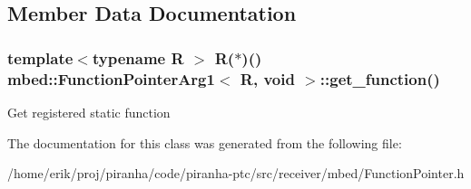 \subsection{Member Data Documentation}
\subsubsection[{\texorpdfstring{get\+\_\+function}{get_function}}]{\setlength{\rightskip}{0pt plus 5cm}template$<$typename R $>$ R($\ast$)() {\bf mbed\+::\+Function\+Pointer\+Arg1}$<$ R, void $>$\+::get\+\_\+function()\hspace{0.3cm}{\ttfamily [inline]}}\hypertarget{classmbed_1_1FunctionPointerArg1_3_01R_00_01void_01_4_a792794bb5157153b294de75f0fc6fc92}{}\label{classmbed_1_1FunctionPointerArg1_3_01R_00_01void_01_4_a792794bb5157153b294de75f0fc6fc92}
Get registered static function 

The documentation for this class was generated from the following file\+:\begin{DoxyCompactItemize}
\item 
/home/erik/proj/piranha/code/piranha-\/ptc/src/receiver/mbed/Function\+Pointer.\+h\end{DoxyCompactItemize}
